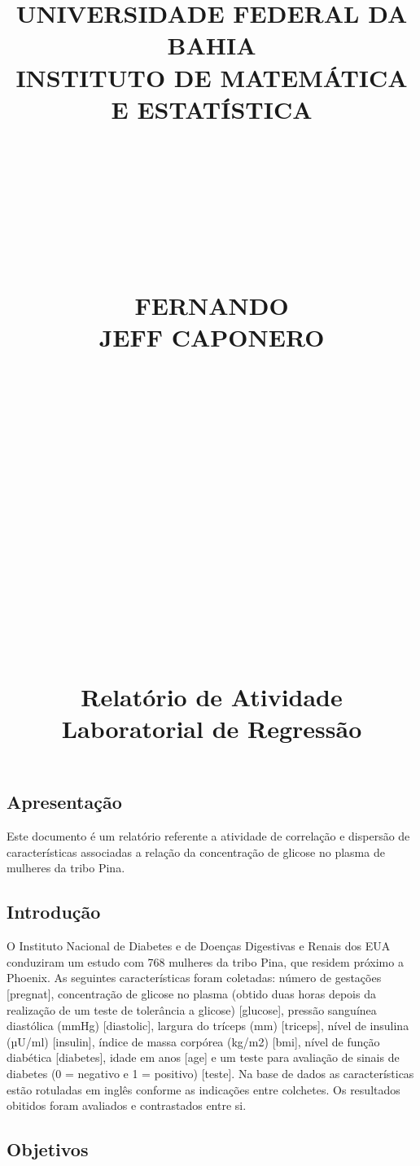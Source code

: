 \documentclass[
]{article}
\title{UNIVERSIDADE FEDERAL DA BAHIA\\
INSTITUTO DE MATEMÁTICA E ESTATÍSTICA\\
\strut \\
\strut \\
\strut \\
FERNANDO\\
JEFF CAPONERO\\
\strut \\
\strut \\
\strut \\
\strut \\
\strut \\
\strut \\
Relatório de Atividade Laboratorial de Regressão}
\author{}
\date{\vspace{-2.5em}}
\begin{document}
\maketitle

{
\setcounter{tocdepth}{2}
\tableofcontents
}
\newpage

\hypertarget{apresentauxe7uxe3o}{%
\subsection{Apresentação}\label{apresentauxe7uxe3o}}

\newline
\newline

Este documento é um relatório referente a atividade de correlação e
dispersão de características associadas a relação da concentração de
glicose no plasma de mulheres da tribo Pina.

\hypertarget{introduuxe7uxe3o}{%
\subsection{Introdução}\label{introduuxe7uxe3o}}

\newline
\newline

O Instituto Nacional de Diabetes e de Doenças Digestivas e Renais dos
EUA conduziram um estudo com 768 mulheres da tribo Pina, que residem
próximo a Phoenix. As seguintes características foram coletadas: número
de gestações {[}pregnat{]}, concentração de glicose no plasma (obtido
duas horas depois da realização de um teste de tolerância a glicose)
{[}glucose{]}, pressão sanguínea diastólica (mmHg) {[}diastolic{]},
largura do tríceps (mm) {[}triceps{]}, nível de insulina (µU/ml)
{[}insulin{]}, índice de massa corpórea (kg/m2) {[}bmi{]}, nível de
função diabética {[}diabetes{]}, idade em anos {[}age{]} e um teste para
avaliação de sinais de diabetes (0 = negativo e 1 = positivo)
{[}teste{]}. Na base de dados as características estão rotuladas em
inglês conforme as indicações entre colchetes. Os resultados obitidos
foram avaliados e contrastados entre si.

\hypertarget{objetivos}{%
\subsection{Objetivos}\label{objetivos}}

\newline
\newline
\end{document}
